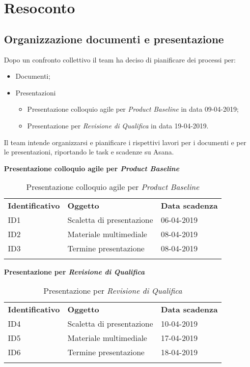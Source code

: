 \clearpage
\section{Resoconto}
	\subsection{Organizzazione documenti e presentazione}
	\label{sec:organizzazione}
	Dopo un confronto collettivo il team ha deciso di pianificare dei processi per:
	\begin{itemize}
		\item Documenti;
		\item Presentazioni
			\begin{itemize}
				\item Presentazione colloquio agile per \textit{Product Baseline} in data 09-04-2019;
				\item Presentazione per \textit{Revisione di Qualifica} in data 19-04-2019.
			\end{itemize}
	\end{itemize}
	Il team intende organizzarsi e pianificare i rispettivi lavori per i documenti e per le presentazioni, riportando le task e scadenze su Asana.
	\begin{center}
		\textbf{Presentazione colloquio agile per \textit{Product Baseline}}
		\renewcommand{\arraystretch}{1.5}
		\begin{longtable}{  p{2.5cm} p{3cm} p{3cm} }
			\rowcolor{tableHeadYellow}
			\textbf{Identificativo} & \textbf{Oggetto}&\textbf{Data scadenza}\\
			ID1 & Scaletta di presentazione & 06-04-2019 \\
			ID2 & Materiale multimediale & 08-04-2019 \\
			ID3 & Termine presentazione & 08-04-2019 \\
			\rowcolor{white}
			\caption{Presentazione colloquio agile per \textit{Product Baseline}}
			\label{sec:tabella2}
		\end{longtable}	
		\textbf{Presentazione per \textit{Revisione di Qualifica}}
		\renewcommand{\arraystretch}{1.5}
		\rowcolors{3}{tableLightYellow}{}
		\begin{longtable}{  p{2.5cm} p{3cm} p{3cm} }
			\rowcolor{tableHeadYellow}
			\textbf{Identificativo} & \textbf{Oggetto}&\textbf{Data scadenza}\\
			ID4 & Scaletta di presentazione & 10-04-2019 \\
			ID5 & Materiale multimediale & 17-04-2019 \\
			ID6 & Termine presentazione & 18-04-2019 \\
			\rowcolor{white}
			\caption{Presentazione per \textit{Revisione di Qualifica}}
			\label{sec:tabella3}
		\end{longtable}	
	\end{center}
